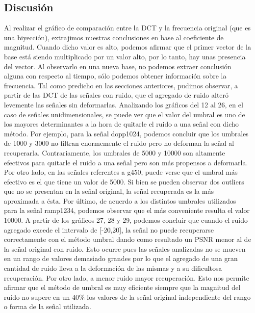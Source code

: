 \documentclass[10pt, a4paper]{article}
\begin{document}
\begin{itemize}
\section{Discusi\'on}
Al realizar el gráfico de comparación entre la DCT y la frecuencia original (que es una biyección), extrajimos nuestras conclusiones en base al coeficiente de magnitud. Cuando dicho valor es alto, podemos afirmar que el primer vector de la base está siendo multiplicado por un valor alto, por lo tanto, hay unas presencia del vector. Al observarlo en una nueva base, no podemos extraer conclusión alguna con respecto al tiempo, sólo podemos obtener información sobre la frecuencia.\newline
\newline
Tal como predicho en las secciones anteriores, pudimos observar, a partir de las DCT de las señales con ruido, que el agregado de ruido alteró levemente las señales sin deformarlas.\newline
\newline
Analizando los gráficos del 12 al 26, en el caso de señales unidimensionales, se puede ver que el valor del umbral es uno de los mayores determinantes a la hora de quitarle el ruido a una señal con dicho método. Por ejemplo, para la señal dopp1024, podemos concluir que los umbrales de 1000 y 3000 no filtran enormemente el ruido pero no deforman la señal al recuperarla. Contrariamente, los umbrales de 5000 y 10000 son altamente efectivos para quitarle el ruido a una señal pero son más propensos a deformarla.\newline
Por otro lado, en las señales referentes a g450, puede verse que el umbral más efectivo es el que tiene un valor de 5000. Si bien se pueden observar dos outliers que no se presentan en la señal original, la señal recuperada es la más aproximada a ésta.\newline
Por último, de acuerdo a los distintos umbrales utilizados para la señal ramp1234, podemos observar que el más conveniente resulta el valor 10000.\newline
\newline
A partir de los gráficos 27, 28 y 29, podemos concluir que cuando el ruido agregado excede el intervalo de [-20,20], la señal no puede recuperarse correctamente con el método umbral dando como resultado un PSNR menor al de la señal original con ruido. Esto ocurre pues las señales analizadas no se mueven en un rango de valores demasiado grandes por lo que el agregado de una gran cantidad de ruido lleva a la deformación de las mismas y a su dificultosa recuperación. Por otro lado, a menor ruido mayor recuperación. Esto nos permite afirmar que el método de umbral es muy eficiente siempre que la magnitud del ruido no supere en un 40\% los valores de la señal original independiente del rango o forma de la señal utilizada.\newline

\end{itemize}
\end{document}
